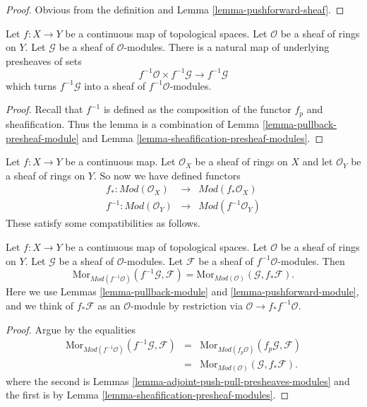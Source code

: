 \begin{proof}
Obvious from the definition and Lemma \ref{lemma-pushforward-sheaf}.
\end{proof}

\begin{lemma}
\label{lemma-pullback-module}
Let $f : X \to Y$ be a continuous map of topological spaces.
Let $\mathcal{O}$ be a sheaf of rings on $Y$. Let
$\mathcal{G}$ be a sheaf of $\mathcal{O}$-modules.
There is a natural map of underlying presheaves of sets
$$
f^{-1}\mathcal{O} \times f^{-1}\mathcal{G}
\longrightarrow
f^{-1}\mathcal{G}
$$
which turns $f^{-1}\mathcal{G}$ into a
sheaf of $f^{-1}\mathcal{O}$-modules.
\end{lemma}

\begin{proof}
Recall that $f^{-1}$ is defined as the composition of the
functor $f_p$ and sheafification. Thus the lemma 
is a combination of Lemma \ref{lemma-pullback-presheaf-module}
and Lemma \ref{lemma-sheafification-presheaf-modules}.
\end{proof}

\noindent
Let $f : X \to Y$ be a continuous map.
Let $\mathcal{O}_X$ be a sheaf of rings on $X$ and
let $\mathcal{O}_Y$ be a sheaf of rings on $Y$.
So now we have defined functors
\begin{eqnarray*}
f_* : \textit{Mod}(\mathcal{O}_X) &
\longrightarrow &
\textit{Mod}(f_*\mathcal{O}_X) \\
f^{-1} : \textit{Mod}(\mathcal{O}_Y) &
\longrightarrow &
\textit{Mod}(f^{-1}\mathcal{O}_Y)
\end{eqnarray*}
These satisfy some compatibilities as follows.

\begin{lemma}
\label{lemma-adjoint-push-pull-modules}
Let $f : X \to Y$ be a continuous map of topological spaces.
Let $\mathcal{O}$ be a sheaf of rings on $Y$.
Let $\mathcal{G}$ be a sheaf of $\mathcal{O}$-modules.
Let $\mathcal{F}$ be a sheaf of $f^{-1}\mathcal{O}$-modules.
Then
$$
\text{Mor}_{\textit{Mod}(f^{-1}\mathcal{O})}(f^{-1}\mathcal{G}, \mathcal{F})
=
\text{Mor}_{\textit{Mod}(\mathcal{O})}(\mathcal{G}, f_*\mathcal{F}).
$$
Here we use
Lemmas \ref{lemma-pullback-module}
and \ref{lemma-pushforward-module}, and we think of
$f_*\mathcal{F}$ as an $\mathcal{O}$-module by restriction via
$\mathcal{O} \to f_*f^{-1}\mathcal{O}$.
\end{lemma}

\begin{proof}
Argue by the equalities
\begin{eqnarray*}
\text{Mor}_{\textit{Mod}(f^{-1}\mathcal{O})}(f^{-1}\mathcal{G}, \mathcal{F})
& = &
\text{Mor}_{\textit{Mod}(f_p\mathcal{O})}(f_p\mathcal{G}, \mathcal{F}) \\
& = &
\text{Mor}_{\textit{Mod}(\mathcal{O})}(\mathcal{G}, f_*\mathcal{F}).
\end{eqnarray*}
where the second is
Lemmas \ref{lemma-adjoint-push-pull-presheaves-modules}
and the first is by Lemma \ref{lemma-sheafification-presheaf-modules}.
\end{proof}

